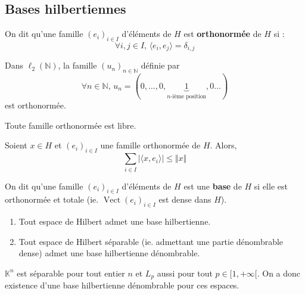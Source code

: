   \subsection{Bases hilbertiennes}


  \begin{definition}
    On dit qu'une famille $(e_i)_{i \in I}$ d'éléments de $H$ est \textbf{orthonormée} de $H$ si :
    \[ \forall i, j \in I, \, \langle e_i, e_j \rangle = \delta_{i,j} \]
  \end{definition}

  \begin{example}
    Dans $\ell_2(\mathbb{N})$, la famille $(u_n)_{n \in \mathbb{N}}$ définie par
    \[ \forall n \in \mathbb{N}, \, u_n = (0, \dots, 0, \underbrace{1}_{n \text{-ième position}}, 0 \dots) \]
    est orthonormée.
  \end{example}

  \begin{proposition}
    Toute famille orthonormée est libre.
  \end{proposition}

  \begin{proposition}
    Soient $x \in H$ et $(e_i)_{i \in I}$ une famille orthonormée de $H$. Alors,
    \[ \sum_{i \in I} \vert \langle x, e_i \rangle \vert \leq \Vert x \Vert \]
  \end{proposition}

  \begin{definition}
    On dit qu'une famille $(e_i)_{i \in I}$ d'éléments de $H$ est une \textbf{base} de $H$ si elle est orthonormée et totale (ie. $\operatorname{Vect}(e_i)_{i \in I}$ est dense dans $H$).
  \end{definition}


  \begin{theorem}
    \begin{enumerate}[label=(\roman*)]
      \item Tout espace de Hilbert admet une base hilbertienne.
      \item Tout espace de Hilbert séparable (ie. admettant une partie dénombrable dense) admet une base hilbertienne dénombrable.
    \end{enumerate}
  \end{theorem}

  \begin{example}
    $\mathbb{K}^n$ est séparable pour tout entier $n$ et $L_p$ aussi pour tout $p \in [1,+\infty[$. On a donc existence d'une base hilbertienne dénombrable pour ces espaces.
  \end{example}

